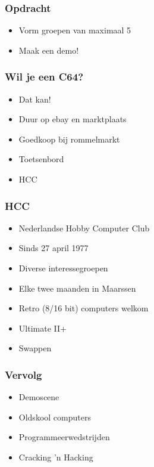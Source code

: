 \documentclass[aspectratio=43]{uva-inf-presentation}
\begin{document}

\begin{frame}
\frametitle{Opdracht}

\begin{itemize}
\item Vorm groepen van maximaal 5
\item Maak een demo!
\end{itemize}

\end{frame}


\begin{frame}
\frametitle{Wil je een C64?}

\begin{itemize}
\item Dat kan!
\item Duur op ebay en marktplaats
\item Goedkoop bij rommelmarkt
\item Toetsenbord
\item HCC
\end{itemize}

\end{frame}


\begin{frame}
\frametitle{HCC}

\begin{itemize}
\item Nederlandse Hobby Computer Club
\item Sinds 27 april 1977
\item Diverse interessegroepen
\item Elke twee maanden in Maarssen
\item Retro (8/16 bit) computers welkom
\item Ultimate II+
\item Swappen
\end{itemize}

\end{frame}


\begin{frame}
\frametitle{Vervolg}

\begin{itemize}
\item Demoscene
\item Oldskool computers
\item Programmeerwedstrijden
\item Cracking 'n Hacking
\end{itemize}

\end{frame}
\end{document}
